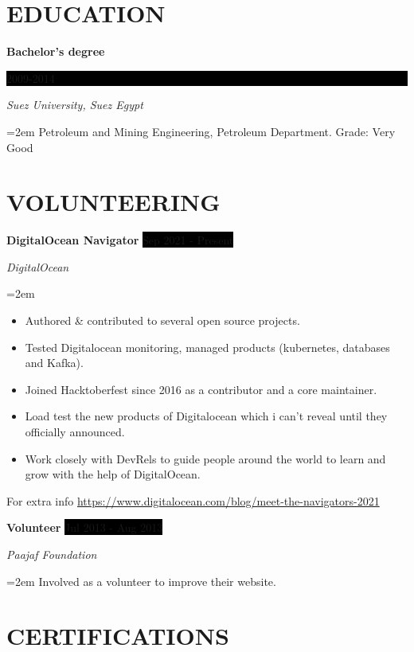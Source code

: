 \documentclass[paper=a4,fontsize=11pt]{scrartcl} %
\newcommand{\sepspace}{\vspace*{1em}}		%
\newcommand{\NewPart}[1]{\section*{\uppercase{#1}}}
\newcommand{\EducationEntry}[4]{
		\noindent \textbf{#1} \hfill      %
		\colorbox{Black}{%
			\parbox{6em}{%
			\hfill\color{White}#2}} \par  %
		\noindent \textit{#3} \par        %
		\noindent\hangindent=2em\hangafter=0 \small #4 %
		\normalsize \par}
\newcommand{\WorkEntry}[4]{				  %
		\noindent \textbf{#1} \hfill      %
		\colorbox{Black}{\color{White}#2} \par  %
		\noindent \textit{#3} \par              %
		\noindent\hangindent=2em\hangafter=0 \small #4 %
		\normalsize \par}
\begin{document}
\NewPart{Education}{}

\EducationEntry{Bachelor's degree}{2009-2014}{Suez University, Suez Egypt}{Petroleum and Mining Engineering, Petroleum Department. Grade: Very Good}


\NewPart{Volunteering}{}

\WorkEntry{DigitalOcean Navigator}{Sep 2021 - Present}{DigitalOcean}{\begin{itemize}
\item Authored \& contributed to several open source projects.
\item Tested Digitalocean monitoring, managed products (kubernetes, databases and Kafka).
\item Joined Hacktoberfest since 2016 as a contributor and a core maintainer.
\item Load test the new products of Digitalocean which i can't reveal until they officially announced.
\item Work closely with DevRels to guide people around the world to learn and grow with the help of DigitalOcean.
\end{itemize}
For extra info \url{https://www.digitalocean.com/blog/meet-the-navigators-2021}}
\sepspace

\WorkEntry{Volunteer}{Jul 2013 - Aug 2013}{Paajaf Foundation}{Involved as a volunteer to improve their website.}


\NewPart{Certifications}{}
\end{document}
